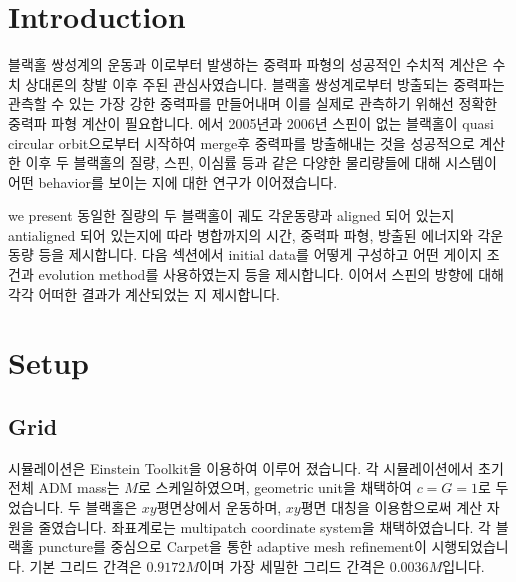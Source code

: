 \documentclass[]{article}
\title{}
\author{}
\begin{document}
\maketitle

\begin{abstract}

\end{abstract}

\section{Introduction}
블랙홀 쌍성계의 운동과 이로부터 발생하는 중력파 파형의 성공적인 수치적 계산은 수치 상대론의 창발 이후 주된 관심사였습니다. 블랙홀 쌍성계로부터 방출되는 중력파는 관측할 수 있는 가장 강한 중력파를 만들어내며 이를 실제로 관측하기 위해선 정확한 중력파 파형 계산이 필요합니다. \cite{Campanelli:2005dd, Baker:2005vv, Pretorius:2005gq}에서 2005년과 2006년 스핀이 없는 블랙홀이 quasi circular orbit으로부터 시작하여 merge후 중력파를 방출해내는 것을 성공적으로 계산한 이후 두 블랙홀의 질량, 스핀, 이심률 등과 같은 다양한 물리량들에 대해 시스템이 어떤 behavior를 보이는 지에 대한 연구가 이어졌습니다.

we present 동일한 질량의 두 블랙홀이 궤도 각운동량과 aligned 되어 있는지 antialigned 되어 있는지에 따라 병합까지의 시간, 중력파 파형, 방출된 에너지와 각운동량 등을 제시합니다. 다음 섹션에서 initial data를 어떻게 구성하고 어떤 게이지 조건과 evolution method를 사용하였는지 등을 제시합니다. 이어서 스핀의 방향에 대해 각각 어떠한 결과가 계산되었는 지 제시합니다.


\section{Setup}

\subsection{Grid}
시뮬레이션은 Einstein Toolkit\cite{EinsteinToolkit:2023_05}을 이용하여 이루어 졌습니다. 각 시뮬레이션에서 초기 전체 ADM mass는 $M$로 스케일하였으며, geometric unit을 채택하여 $c=G=1$로 두었습니다.
두 블랙홀은 $xy$평면상에서 운동하며, $xy$평면 대칭을 이용함으로써 계산 자원을 줄였습니다. 좌표계로는 multipatch coordinate system\cite{Pollney:2009yz}을 채택하였습니다. 각 블랙홀 puncture를 중심으로 Carpet\cite{CarpetCode:web}을 통한 adaptive mesh refinement이 시행되었습니다. 기본 그리드 간격은 $0.9172M$이며 가장 세밀한 그리드 간격은 $0.0036M$입니다. 
\end{document}
